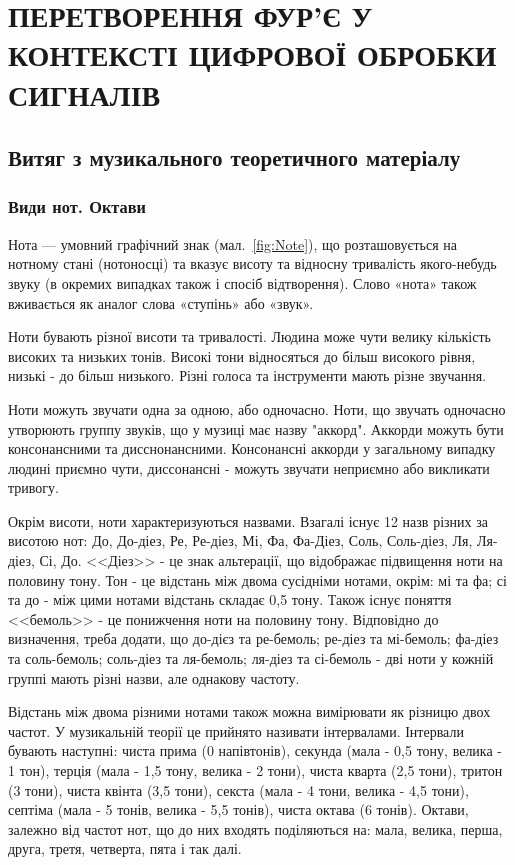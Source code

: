 \section{ПЕРЕТВОРЕННЯ ФУР'Є У КОНТЕКСТІ ЦИФРОВОЇ ОБРОБКИ СИГНАЛІВ}

\subsection{Витяг з музикального теоретичного матеріалу}

\subsubsection{Види нот. Октави}


Нота — умовний графічний знак (мал.~\ref{fig:Note}), що розташовується на нотному стані (нотоносці) та вказує висоту та відносну тривалість якого-небудь звуку (в окремих випадках також і спосіб відтворення). Слово «нота» також вживається як аналог слова «ступінь» або «звук».

Ноти бувають різної висоти та тривалості. Людина може чути велику кількість високих та низьких тонів. Високі тони відносяться до більш високого рівня, низькі - до більш низького. Різні голоса та інструменти мають різне звучання. 

Ноти можуть звучати одна за одною, або одночасно. Ноти, що звучать одночасно утворюють группу звуків, що у музиці має назву "аккорд". Аккорди можуть бути консонансними та дисснонансними. Консонансні аккорди у загальному випадку людині приємно чути, диссонансні - можуть звучати неприємно або викликати тривогу. 

Окрім висоти, ноти характеризуються назвами. Взагалі існує 12 назв різних за висотою нот: До, До-діез, Ре, Ре-діез, Мі, Фа, Фа-Діез, Соль, Соль-діез, Ля, Ля-діез, Сі, До. <<Діез>> - це знак альтерації, що відображає підвищення ноти на половину тону. Тон - це відстань між двома сусідніми нотами, окрім: мі та фа; сі та до - між цими нотами відстань складає 0,5 тону. Також існує поняття <<бемоль>> - це понижчення ноти на половину тону. Відповідно до визначення, треба додати, що до-дієз та ре-бемоль; ре-діез та мі-бемоль; фа-діез та соль-бемоль; соль-діез та ля-бемоль; ля-діез та сі-бемоль - дві ноти у кожній группі мають різні назви, але однакову частоту.

\label{octaves-info}
Відстань між двома різними нотами також можна вимірювати як різницю двох частот. У музикальній теорії це прийнято називати інтервалами. Інтервали бувають наступні: чиста прима (0 напівтонів), секунда (мала - 0,5 тону, велика - 1 тон), терція (мала - 1,5 тону, велика - 2 тони), чиста кварта (2,5 тони), тритон (3 тони), чиста квінта (3,5 тони), секста (мала - 4 тони, велика - 4,5 тони), септіма (мала - 5 тонів, велика - 5,5 тонів), чиста октава (6 тонів).  Октави, залежно від частот нот, що до них входять поділяються на: мала, велика, перша, друга, третя, четверта, пята і так далі.

